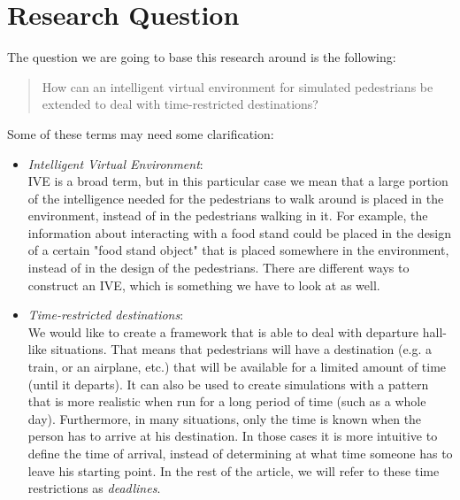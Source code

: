 \documentclass[11pt, a4paper]{book}
\begin{document}
\section{Research Question}
The question we are going to base this research around is the following:
\begin{quote}
How can an intelligent virtual environment for simulated pedestrians be extended to deal with time-restricted destinations?
\end{quote}
Some of these terms may need some clarification:
\begin{itemize}
\item \emph{Intelligent Virtual Environment}:\\
IVE is a broad term, but in this particular case we mean that a large portion of the intelligence needed for the pedestrians to walk around is placed in the environment, instead of in the pedestrians walking in it. For example, the information about interacting with a food stand could be placed in the design of a certain "food stand object" that is placed somewhere in the environment, instead of in the design of the pedestrians. There are different ways to construct an IVE, which is something we have to look at as well. 

\item \emph{Time-restricted destinations}:\\
We would like to create a framework that is able to deal with departure hall-like situations. That means that pedestrians will have a destination (e.g. a train, or an airplane, etc.) that will be available for a limited amount of time (until it departs). It can also be used to create simulations with a pattern that is more realistic when run for a long period of time (such as a whole day). Furthermore, in many situations, only the time is known when the person has to arrive at his destination. In those cases it is more intuitive to define the time of arrival, instead of determining at what time someone has to leave his starting point. In the rest of the article, we will refer to these time restrictions as \emph{deadlines}.
\end{itemize}
\end{document}
